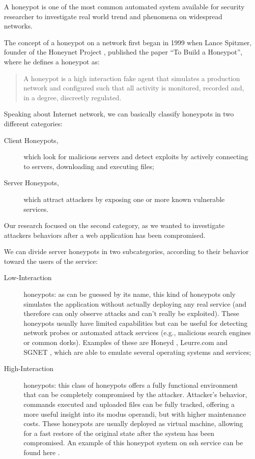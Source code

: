 A honeypot is one of the most common automated system available for security researcher to investigate real world trend and phenomena on widespread networks.

The concept of a honeypot on a network first began in 1999 when Lance Spitzner, founder of the Honeynet Project \cite{honeynetProject}, published the paper ``To Build a Honeypot'', where he defines a honeypot as:
\begin{quote}
A honeypot is a high interaction fake agent that simulates a production network and configured such that all activity is monitored, recorded and, in a degree, discreetly regulated.
\end{quote}
Speaking about Internet network, we can basically classify honeypots in two different categories:
\begin{description}
\item[Client Honeypots,] which look for malicious servers and detect exploits by actively connecting to servers, downloading and executing files;
\item[Server Honeypots,] which attract attackers by exposing one or more known vulnerable services.
\end{description}
Our research focused on the second category, as we wanted to investigate attackers behaviors after a web application has been compromised.

We can divide server honeypots in two subcategories, according to their behavior toward the users of the service:
\begin{description}
\item[Low-Interaction] honeypots: as can be guessed by its name, this kind of honeypots only simulates the application without actually deploying any real service (and therefore can only observe attacks and can't really be exploited). These honeypots usually have limited capabilities but can be useful for detecting network probes or automated attack services (e.g., malicious search engines or common dorks). Examples of these are Honeyd \cite{honeyd}, Leurre.com \cite{leurre} and SGNET \cite{sgnet}, which are able to emulate several operating systems and services;
\item[High-Interaction] honeypots: this class of honeypots offers a fully functional environment that can be completely compromised by the attacker. Attacker's behavior, commands executed and uploaded files can be fully tracked, offering a more useful insight into its modus operandi, but with higher maintenance costs. These honeypots are usually deployed as virtual machine, allowing for a fast restore of the original state after the system has been compromised. An example of this honeypot system on ssh service can be found here \cite{highhoney}.
\end{description}

